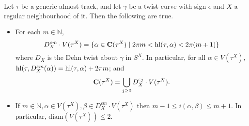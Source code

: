 \begin{lemma}\label{lem:onerollingdirection}
Let $\tau$ be a generic almost track, and let $\gamma$ be a twist curve with sign $\epsilon$ and $X$ a regular neighbourhood of it. Then the following are true. 
\begin{itemize}
\item For each $m\in\mathbb N$,
$$
D_X^{\varepsilon m}\cdot V(\tau^X)=\{\alpha\in\mathbf C(\tau^X)\mid 2\pi m<\mathrm{hl}(\tau,\alpha)<2\pi(m+1)\}
$$
where $D_X$ is the Dehn twist about $\gamma$ in $S^X$. In particular, for all $\alpha\in V(\tau^X)$, $\mathrm{hl}(\tau,D_X^{\varepsilon m}(\alpha))=\mathrm{hl}(\tau,\alpha)+2\pi m$; and
$$
\mathbf C(\tau^X)=\bigcup_{j\geq 0} D_X^{\varepsilon j}\cdot V(\tau^X).
$$
\item If $m\in\mathbb N,\alpha\in V(\tau^X), \beta\in D_X^{\epsilon m}\cdot V(\tau^X)$ then $m-1\leq i(\alpha,\beta)\leq m+1$. In particular, $\mathrm{diam} \left(V(\tau^X)\right)\leq 2$.
\end{itemize}
\end{lemma}
